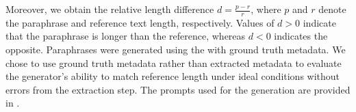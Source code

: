 Moreover, we obtain the relative length difference $d = \frac{p - r}{r}$, where $p$ and $r$ denote the paraphrase and reference text length, respectively. 
Values of $d > 0$ indicate that the paraphrase is longer than the reference, whereas $d < 0$ indicates the opposite.
Paraphrases were generated using the \pgenerator{} with ground truth metadata.
We chose to use ground truth metadata rather than extracted metadata to evaluate the generator's ability to match reference length under ideal conditions without errors from the extraction step.
The prompts used for the generation are provided in .
